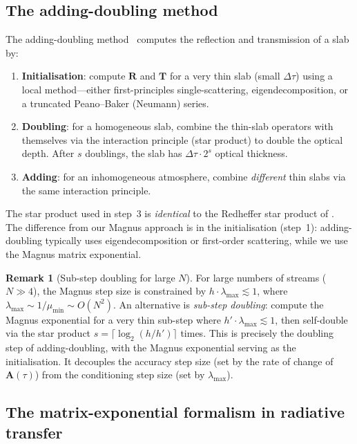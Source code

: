 \documentclass[11pt,a4paper]{article}
\newcommand{\mat}[1]{\mathbf{#1}}
\theoremstyle{definition}
\newtheorem{remark}{Remark}
\begin{document}
\subsection{The adding-doubling method}\label{sec:adding_doubling}

The adding-doubling method~\cite{hansen1974,vandehulst1980,
evans1991} computes the reflection and transmission of a slab by:
\begin{enumerate}[nosep]
\item \textbf{Initialisation}: compute $\mat{R}$ and $\mat{T}$ for a
  very thin slab (small $\Delta\tau$) using a local method---either
  first-principles single-scattering, eigendecomposition, or a
  truncated Peano--Baker (Neumann) series.
\item \textbf{Doubling}: for a homogeneous slab, combine the thin-slab
  operators with themselves via the interaction principle (star product)
  to double the optical depth.  After $s$ doublings, the slab has
  $\Delta\tau\cdot 2^s$ optical thickness.
\item \textbf{Adding}: for an inhomogeneous atmosphere, combine
  \emph{different} thin slabs via the same interaction principle.
\end{enumerate}

The star product used in step~3 is \emph{identical} to the Redheffer
star product of .  The difference from our
Magnus approach is in the initialisation (step~1): adding-doubling
typically uses eigendecomposition or first-order scattering, while we
use the Magnus matrix exponential.

\begin{remark}[Sub-step doubling for large $N$]
For large numbers of streams ($N \gg 4$), the Magnus step size is
constrained by $h \cdot \lambda_{\max} \lesssim 1$, where
$\lambda_{\max} \sim 1/\mu_{\min} \sim O(N^2)$.  An alternative is
\emph{sub-step doubling}: compute the Magnus exponential for a very thin
sub-step where $h'\cdot\lambda_{\max}\lesssim 1$, then self-double via
the star product $s=\lceil\log_2(h/h')\rceil$ times.  This is
precisely the doubling step of adding-doubling, with the Magnus
exponential serving as the initialisation.  It decouples the accuracy
step size (set by the rate of change of $\mat{A}(\tau)$) from the
conditioning step size (set by $\lambda_{\max}$).
\end{remark}

\subsection{The matrix-exponential formalism in radiative transfer}
\label{sec:matexp_rt}
\end{document}

